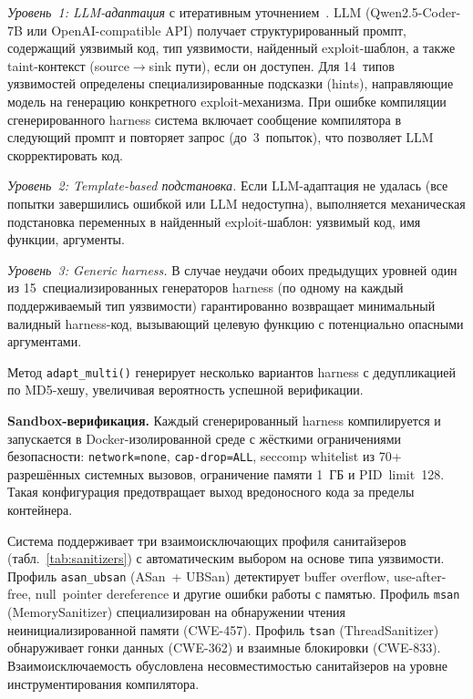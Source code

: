 \documentclass[runningheads]{llncs}
\begin{document}
\textit{Уровень~1: LLM-адаптация} с итеративным уточнением~\cite{gajjar2026vbf}. LLM (Qwen2.5-Coder-7B или OpenAI-compatible API) получает структурированный промпт, содержащий уязвимый код, тип уязвимости, найденный exploit-шаблон, а также taint-контекст (source$\to$sink пути), если он доступен. Для 14~типов уязвимостей определены специализированные подсказки (hints), направляющие модель на генерацию конкретного exploit-механизма. При ошибке компиляции сгенерированного harness система включает сообщение компилятора в следующий промпт и повторяет запрос (до~3~попыток), что позволяет LLM скорректировать код.

\textit{Уровень~2: Template-based подстановка.} Если LLM-адаптация не удалась (все попытки завершились ошибкой или LLM недоступна), выполняется механическая подстановка переменных в найденный exploit-шаблон: уязвимый код, имя функции, аргументы.

\textit{Уровень~3: Generic harness.} В случае неудачи обоих предыдущих уровней один из 15~специализированных генераторов harness (по одному на каждый поддерживаемый тип уязвимости) гарантированно возвращает минимальный валидный harness-код, вызывающий целевую функцию с потенциально опасными аргументами.

Метод \texttt{adapt\_multi()} генерирует несколько вариантов harness с дедупликацией по MD5-хешу, увеличивая вероятность успешной верификации.

\textbf{Sandbox-верификация.} Каждый сгенерированный harness компилируется и запускается в Docker-изолированной среде с жёсткими ограничениями безопасности: \texttt{network=none}, \texttt{cap-drop=ALL}, seccomp whitelist из 70+ разрешённых системных вызовов, ограничение памяти 1~ГБ и PID~limit~128. Такая конфигурация предотвращает выход вредоносного кода за пределы контейнера.

Система поддерживает три взаимоисключающих профиля санитайзеров (табл.~\ref{tab:sanitizers}) с автоматическим выбором на основе типа уязвимости. Профиль \texttt{asan\_ubsan} (ASan~+ UBSan) детектирует buffer overflow, use-after-free, null~pointer dereference и другие ошибки работы с памятью. Профиль \texttt{msan} (MemorySanitizer) специализирован на обнаружении чтения неинициализированной памяти (CWE-457). Профиль \texttt{tsan} (ThreadSanitizer) обнаруживает гонки данных (CWE-362) и взаимные блокировки (CWE-833). Взаимоисключаемость обусловлена несовместимостью санитайзеров на уровне инструментирования компилятора.
\end{document}

